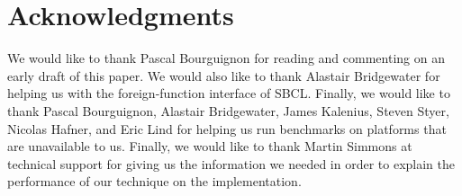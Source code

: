 \section{Acknowledgments}

We would like to thank Pascal Bourguignon for reading and commenting
on an early draft of this paper.  We would also like to thank Alastair
Bridgewater for helping us with the foreign-function interface of
SBCL.  Finally, we would like to thank Pascal Bourguignon, Alastair
Bridgewater, James Kalenius, Steven Styer, Nicolas Hafner, and Eric
Lind for helping us run benchmarks on platforms that are unavailable
to us.  Finally, we would like to thank Martin Simmons at \lispworks{}
technical support for giving us the information we needed in order to
explain the performance of our technique on the \lispworks{}
\commonlisp{} implementation.
